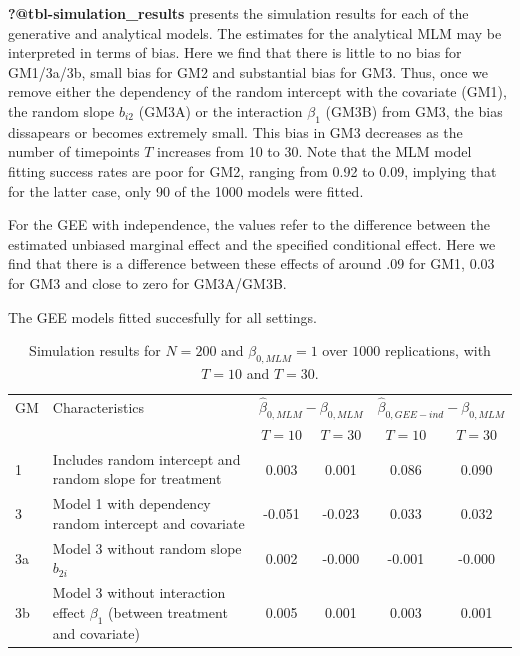 \documentclass[
  12pt,
  a4paper,
]{article}
\begin{document}
\textbf{?@tbl-simulation\_results} presents the simulation results for
each of the generative and analytical models. The estimates for the
analytical MLM may be interpreted in terms of bias. Here we find that
there is little to no bias for GM1/3a/3b, small bias for GM2 and
substantial bias for GM3. Thus, once we remove either the dependency of
the random intercept with the covariate (GM1), the random slope
\(b_{i2}\) (GM3A) or the interaction \(\beta_1\) (GM3B) from GM3, the
bias dissapears or becomes extremely small. This bias in GM3 decreases
as the number of timepoints \(T\) increases from 10 to 30. Note that the
MLM model fitting success rates are poor for GM2, ranging from 0.92 to
0.09, implying that for the latter case, only 90 of the 1000 models were
fitted.

For the GEE with independence, the values refer to the difference
between the estimated unbiased marginal effect and the specified
conditional effect. Here we find that there is a difference between
these effects of around .09 for GM1, 0.03 for GM3 and close to zero for
GM3A/GM3B.

The GEE models fitted succesfully for all settings.

\begin{table}[H]
    \caption{Simulation results for $N=200$ and $\beta_{0,MLM} = 1$ over $1000$ replications, with $T=10$ and $T=30$.}
    \centering
    \begin{tabular}{@{}p{1.5cm} p{5cm} cc cc@{}}
        \toprule
        GM & Characteristics & \multicolumn{2}{c}{$\hat{\beta}_{0,MLM}-\beta_{0,MLM}$} & \multicolumn{2}{c}{$\hat{\beta}_{0,GEE-ind}-\beta_{0,MLM}$} \\ 
        \cmidrule(lr){3-4} \cmidrule(lr){5-6}
           &                 & \( T = 10 \) & \( T = 30 \) & \( T = 10 \) & \( T = 30 \) \\ \midrule
        1  & Includes random intercept and random slope for treatment & 0.003 & 0.001 & 0.086 & 0.090 \\
        3  & Model 1 with dependency random intercept and covariate       & -0.051 & -0.023 & 0.033 & 0.032 \\
        3a & Model 3 without random slope $b_{2i}$           & 0.002 & -0.000 & -0.001 & -0.000 \\
        3b & Model 3 without interaction effect $\beta_1$ (between treatment and covariate) & 0.005 & 0.001 & 0.003 & 0.001 \\
        \bottomrule
    \end{tabular}
    \label{tab:tbl-simulation_results}
\end{table}
\end{document}

